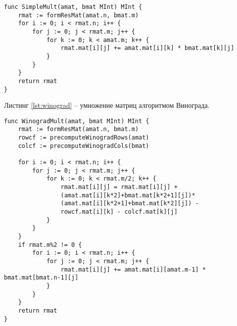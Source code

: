 \captionsetup{singlelinecheck = false, justification=raggedright}
\begin{lstlisting}[label=lst:algebr,caption=Классический алгоритм умножения]
func SimpleMult(amat, bmat MInt) MInt {
	rmat := formResMat(amat.n, bmat.m)
	for i := 0; i < rmat.n; i++ {
		for j := 0; j < rmat.m; j++ {
			for k := 0; k < amat.m; k++ {
				rmat.mat[i][j] += amat.mat[i][k] * bmat.mat[k][j]
			}
		}
	}
	return rmat
}
\end{lstlisting}
Листинг \ref{lst:winograd} -- умножение матриц алгоритмом Винограда.
\begin{lstlisting}[label=lst:winograd,caption=Алгоритм умнложения Виноградом]
func WinogradMult(amat, bmat MInt) MInt {
	rmat := formResMat(amat.n, bmat.m)
	rowcf := precomputeWinogradRows(amat)
	colcf := precomputeWinogradCols(bmat)
	
	for i := 0; i < rmat.n; i++ {
		for j := 0; j < rmat.m; j++ {
			for k := 0; k < rmat.m/2; k++ {
				rmat.mat[i][j] = rmat.mat[i][j] + 
				(amat.mat[i][k*2]+bmat.mat[k*2+1][j])*
				(amat.mat[i][k*2+1]+bmat.mat[k*2][j]) -
				rowcf.mat[i][k] - colcf.mat[k][j]
			}
		}
	}
	if rmat.m%2 != 0 {
		for i := 0; i < rmat.n; i++ {
			for j := 0; j < rmat.m; j++ {
				rmat.mat[i][j] += amat.mat[i][amat.m-1] * bmat.mat[bmat.n-1][j]
			}
		}
	}
	return rmat
}
\end{lstlisting}	


